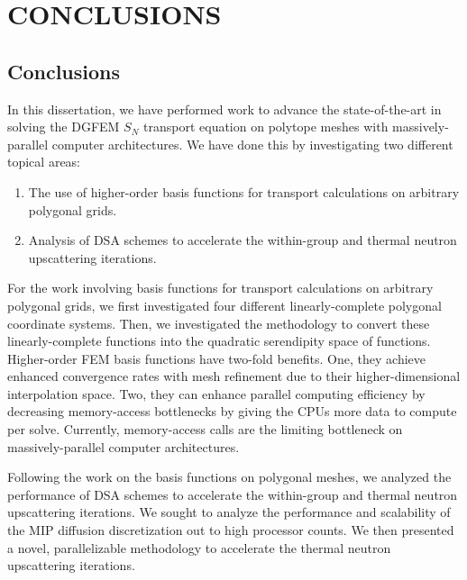 %
%
%
\chapter{\uppercase {Conclusions}}
\label{sec::Conclusions}


\section{Conclusions}
\label{sec::Conclusions_Conclusions}

In this dissertation, we have performed work to advance the state-of-the-art in solving the DGFEM $S_N$ transport equation on polytope meshes with massively-parallel computer architectures. We have done this by investigating two different topical areas:

\begin{enumerate}
\item The use of higher-order basis functions for transport calculations on arbitrary polygonal grids.
\item Analysis of DSA schemes to accelerate the within-group and thermal neutron upscattering iterations.
\end{enumerate}

For the work involving basis functions for transport calculations on arbitrary polygonal grids, we first investigated four different linearly-complete polygonal coordinate systems. Then, we investigated the methodology to convert these linearly-complete functions into the quadratic serendipity space of functions. Higher-order FEM basis functions have two-fold benefits. One, they achieve enhanced convergence rates with mesh refinement due to their higher-dimensional interpolation space. Two, they can enhance parallel computing efficiency by decreasing memory-access bottlenecks by giving the CPUs more data to compute per solve. Currently, memory-access calls are the limiting bottleneck on massively-parallel computer architectures. 

Following the work on the basis functions on polygonal meshes, we analyzed the performance of DSA schemes to accelerate the within-group and thermal neutron upscattering iterations. We sought to analyze the performance and scalability of the MIP diffusion discretization out to high processor counts. We then presented a novel, parallelizable methodology to accelerate the thermal neutron upscattering iterations.

